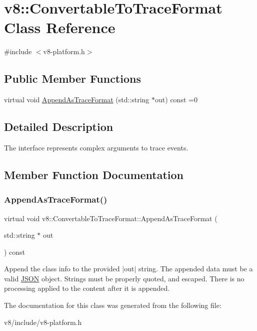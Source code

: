 \hypertarget{classv8_1_1ConvertableToTraceFormat}{}\section{v8\+:\+:Convertable\+To\+Trace\+Format Class Reference}
\label{classv8_1_1ConvertableToTraceFormat}


{\ttfamily \#include $<$v8-\/platform.\+h$>$}

\subsection*{Public Member Functions}
\begin{DoxyCompactItemize}
\item 
virtual void \mbox{\hyperlink{classv8_1_1ConvertableToTraceFormat_a11f3295df2906e09c1f266049d130013}{Append\+As\+Trace\+Format}} (std\+::string $\ast$out) const =0
\end{DoxyCompactItemize}


\subsection{Detailed Description}
The interface represents complex arguments to trace events. 

\subsection{Member Function Documentation}
\mbox{\label{classv8_1_1ConvertableToTraceFormat_a11f3295df2906e09c1f266049d130013}} 
\subsubsection{\texorpdfstring{Append\+As\+Trace\+Format()}{AppendAsTraceFormat()}}
{\footnotesize\ttfamily virtual void v8\+::\+Convertable\+To\+Trace\+Format\+::\+Append\+As\+Trace\+Format (\begin{DoxyParamCaption}\item[{std\+::string $\ast$}]{out }\end{DoxyParamCaption}) const\hspace{0.3cm}{\ttfamily [pure virtual]}}

Append the class info to the provided $\vert$out$\vert$ string. The appended data must be a valid \mbox{\hyperlink{classv8_1_1JSON}{J\+S\+ON}} object. Strings must be properly quoted, and escaped. There is no processing applied to the content after it is appended. 

The documentation for this class was generated from the following file\+:\begin{DoxyCompactItemize}
\item 
v8/include/v8-\/platform.\+h\end{DoxyCompactItemize}
